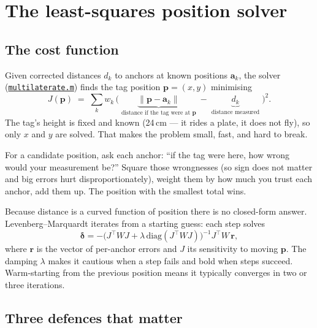\documentclass[11pt,a4paper]{article}
\newcommand{\gh}[2]{\href{https://github.com/AdershM-2/UWB_3/blob/main/#1}{\texttt{#2}}}
\begin{document}
\section{The least-squares position solver}
\label{sec:solver}

\subsection{The cost function}

Given corrected distances $d_k$ to anchors at known positions $\mathbf{a}_k$, the
solver (\gh{matlab/+dune/multilaterate.m}{multilaterate.m}) finds the tag position
$\mathbf{p} = (x,y)$ minimising
\begin{equation}
\label{eq:ls}
J(\mathbf{p}) \;=\; \sum_k w_k\,
\Big(\; \underbrace{\lVert \mathbf{p}-\mathbf{a}_k \rVert}_{\text{distance if the tag were at } \mathbf{p}}
\;-\; \underbrace{d_k}_{\text{distance measured}} \;\Big)^2 .
\end{equation}
The tag's height is fixed and known (24\,cm --- it rides a plate, it does not fly),
so only $x$ and $y$ are solved. That makes the problem small, fast, and hard to
break.

\begin{plainwords}
For a candidate position, ask each anchor: ``if the tag were here, how wrong would
your measurement be?'' Square those wrongnesses (so sign does not matter and big
errors hurt disproportionately), weight them by how much you trust each anchor, add
them up. The position with the smallest total wins.
\end{plainwords}

Because distance is a curved function of position there is no closed-form answer.
Levenberg--Marquardt iterates from a starting guess: each step solves
\begin{equation}
\boldsymbol{\delta} = -\big(J^\top W J + \lambda\,\mathrm{diag}(J^\top W J)\big)^{-1}
J^\top W\, \mathbf{r},
\end{equation}
where $\mathbf{r}$ is the vector of per-anchor errors and $J$ its sensitivity to
moving $\mathbf{p}$. The damping $\lambda$ makes it cautious when a step fails and
bold when steps succeed. Warm-starting from the previous position means it
typically converges in two or three iterations.

\subsection{Three defences that matter}
\end{document}

